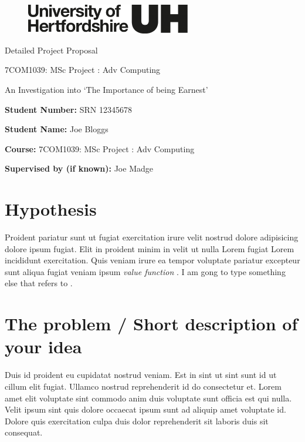 \documentclass[a4paper, notitlepage, 12pt]{article}
\newcommand{\projecttitle}{An Investigation into `The Importance of being Earnest'}
\newcommand{\studentname}{Joe Bloggs}
\newcommand{\studentnumber}{SRN 12345678}
\newcommand{\supervisorname}{Joe Madge}
\newcommand{\doctype}{Detailed Project Proposal}
\newcommand{\coursecode}{7COM1039}
\newcommand{\coursedescr}{MSc Project : Adv Computing}
\begin{document}
\begin{figure}
    \vspace{-3mm}
    \includegraphics[width=7.2cm]{herts-logo-black.png}
\end{figure}
\noindent \huge{\doctype}\par
\vspace{-0.5em} \large \coursecode  : \coursedescr \par

\onehalfspacing

\vspace{2em}
\begin{tcolorbox}[width=\textwidth]
    \vspace{2em}
    \begin{center}
        {\Large \projecttitle} \newline
    \end{center}
    \vspace{2em}
    
    \textbf{Student Number:} \studentnumber \par 
    \textbf{Student Name:} \studentname \par
    \vspace{2em}
    
    \textbf{Course:} \coursecode : \coursedescr \par
    \textbf{Supervised by (if known):} \supervisorname
\end{tcolorbox}


\section{Hypothesis}
Proident pariatur sunt ut fugiat exercitation irure velit nostrud dolore adipisicing dolore ipsum fugiat. Elit in proident minim in velit ut nulla Lorem fugiat Lorem incididunt exercitation. Quis veniam irure ea tempor voluptate pariatur excepteur sunt aliqua fugiat veniam ipsum \emph{value function}  \citep{Sutton2018}.  I am gong to type something else that refers to \citep{Callaway2018:resource-rational-planning}.

\section{The problem / Short description of your idea}
Duis id proident eu cupidatat nostrud veniam. Est in sint ut sint sunt id ut cillum elit fugiat. Ullamco nostrud reprehenderit id do consectetur et. Lorem amet elit voluptate sint commodo anim duis voluptate sunt officia est qui nulla. Velit ipsum sint quis dolore occaecat ipsum sunt ad aliquip amet voluptate id. Dolore quis exercitation culpa duis dolor reprehenderit sit laboris duis sit consequat.
\end{document}
